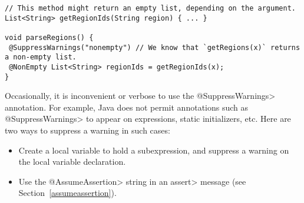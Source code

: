 \begin{Verbatim}
// This method might return an empty list, depending on the argument.
List<String> getRegionIds(String region) { ... }

void parseRegions() {
 @SuppressWarnings("nonempty") // We know that `getRegions(x)` returns a non-empty list.
 @NonEmpty List<String> regionIds = getRegionIds(x);
}
\end{Verbatim}


Occasionally, it is inconvenient or verbose to use the \<@SuppressWarnings>
annotation.
For example, Java does not permit annotations such as \<@SuppressWarnings> to
appear on expressions, static initializers, etc.
Here are two ways to suppress a warning in such cases:

\begin{itemize}
\item
  Create a local variable to hold a subexpression, and
  suppress a warning on the local variable declaration.
\item
  Use the \<@AssumeAssertion> string in
  an \<assert> message (see Section~\ref{assumeassertion}).
\end{itemize}

